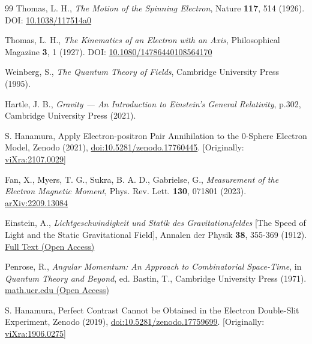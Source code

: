 \documentclass[12pt,letterpaper]{article} %
\begin{document}
\begin{thebibliography}{99}
Thomas, L. H., 
\textit{The Motion of the Spinning Electron}, 
Nature \textbf{117}, 514 (1926). 
DOI: \href{https://doi.org/10.1038/117514a0}{10.1038/117514a0}

Thomas, L. H., 
\textit{The Kinematics of an Electron with an Axis}, 
Philosophical Magazine \textbf{3}, 1 (1927). 
DOI: \href{https://doi.org/10.1080/14786440108564170}{10.1080/14786440108564170}

Weinberg, S., 
\textit{The Quantum Theory of Fields}, Cambridge University Press (1995).

Hartle, J. B., 
\textit{Gravity --- An Introduction to Einstein's General Relativity}, p.302, Cambridge University Press (2021).

S. Hanamura, Apply Electron-positron Pair Annihilation to the 0-Sphere Electron Model, Zenodo (2021), \href{https://doi.org/10.5281/zenodo.17760445}{doi:10.5281/zenodo.17760445}. [Originally: \href{https://vixra.org/abs/2107.0029}{viXra:2107.0029}]

Fan, X., Myers, T. G., Sukra, B. A. D., Gabrielse, G., 
\textit{Measurement of the Electron Magnetic Moment}, 
Phys. Rev. Lett. \textbf{130}, 071801 (2023). 
\href{https://arxiv.org/abs/2209.13084}{arXiv:2209.13084}

Einstein, A.,
\textit{Lichtgeschwindigkeit und Statik des Gravitationsfeldes} [The Speed of Light and the Static Gravitational Field],
Annalen der Physik \textbf{38}, 355-369 (1912). 
\href{http://myweb.rz.uni-augsburg.de/~eckern/adp/history/einstein-papers/1912_38_355-369.pdf}{Full Text (Open Access)}

Penrose, R., 
\textit{Angular Momentum: An Approach to Combinatorial Space-Time}, 
in \textit{Quantum Theory and Beyond}, ed. Bastin, T., Cambridge University Press (1971).
\href{https://math.ucr.edu/home/baez/penrose/Penrose-AngularMomentum.pdf}{math.ucr.edu (Open Access)}

S. Hanamura, Perfect Contrast Cannot be Obtained in the Electron Double-Slit Experiment, Zenodo (2019), \href{https://doi.org/10.5281/zenodo.17759699}{doi:10.5281/zenodo.17759699}. [Originally: \href{https://vixra.org/abs/1906.0275}{viXra:1906.0275}]

\end{thebibliography}

\end{document}
